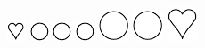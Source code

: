 \documentclass{standalone}
\begin{document}
{\includegraphics{base_E23-4}
	\includegraphics{base_E23-5}
	\includegraphics{base_E23-5}
	\includegraphics{base_E23-5}
	\includegraphics{base_E23-2}
	\includegraphics{base_E23-2}
	\includegraphics{base_E23-3}}
\end{document}
